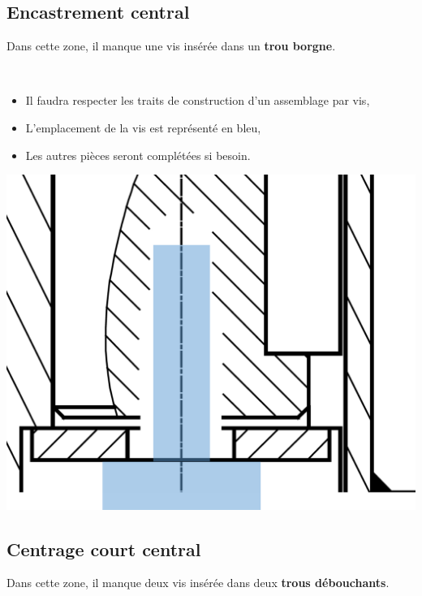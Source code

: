 \subsection{Encastrement central}

Dans cette zone, il manque une vis insérée dans un \textbf{trou borgne}.

~\ \\
\begin{minipage}{0.6\linewidth}
\begin{itemize}
 \item Il faudra respecter les traits de construction d'un assemblage par vis,
 \item L'emplacement de la vis est représenté en bleu,
 \item Les autres pièces seront complétées si besoin.
\end{itemize}
\end{minipage}\hfill
\begin{minipage}{0.35\linewidth}
\begin{center}
 \includegraphics[width=0.7\linewidth]{img/fig3.pdf}
\end{center}
\end{minipage}

\subsection{Centrage court central}

Dans cette zone, il manque deux vis insérée dans deux \textbf{trous débouchants}.

